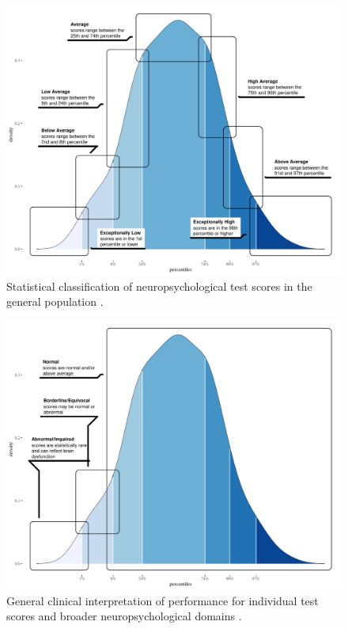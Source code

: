 \documentclass[%
numbers=noendperiod,
parskip=half,
bibliography=totoc,
DIV=calc,headsepline=true,
]{scrartcl}
\begin{document}
\begin{figure}[!ht]
\includegraphics{plot_narrow} \caption[Statistical classification of neuropsychological test
scores in the general population \autocite{guilmetteAmericanAcademyClinical2020}.]{Statistical classification of neuropsychological test
scores in the general population \autocite{guilmetteAmericanAcademyClinical2020}.}\label{fig:gauss-plot-narrow}
\end{figure}





\begin{figure}[!ht]
\includegraphics{plot_broad} \caption[General clinical interpretation of performance for
individual test scores and broader neuropsychological domains
\autocite{schoenbergReportingStandardsNeuropsychological2017}.]{General clinical interpretation of performance for
individual test scores and broader neuropsychological domains
\autocite{schoenbergReportingStandardsNeuropsychological2017}.}\label{fig:gauss-plot-broad}
\end{figure}
\end{document}
